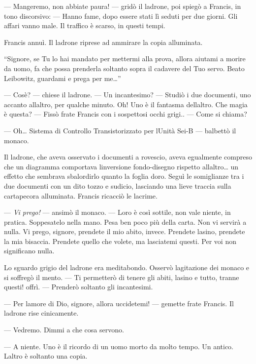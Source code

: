 --- Mangeremo, non abbiate paura! --- gridò il ladrone, poi spiegò a
Francis, in tono discorsivo: --- Hanno fame, dopo essere stati lì seduti
per due giorni. Gli affari vanno male. Il traffico è scarso, in questi
tempi.

Francis annuì. Il ladrone riprese ad ammirare la copia alluminata.

``Signore, se Tu lo hai mandato per mettermi alla prova, allora aiutami
a morire da uomo, fa\textquotesingle{} che possa prenderla soltanto
sopra il cadavere del Tuo servo. Beato Leibowitz, guardami e prega per
me\ldots''

--- Cos\textquotesingle è? --- chiese il ladrone. --- Un incantesimo?
--- Studiò i due documenti, uno accanto all\textquotesingle altro, per
qualche minuto. Oh! Uno è il fantasma dell\textquotesingle altro. Che
magia è questa? --- Fissò frate Francis con i sospettosi occhi grigi..
--- Come si chiama?

--- Oh\ldots{} Sistema di Controllo Transistorizzato per
l\textquotesingle Unità Sei-B --- balbettò il monaco.

Il ladrone, che aveva osservato i documenti a rovescio, aveva egualmente
compreso che un diagramma comportava l\textquotesingle inversione
fondo-disegno rispetto all\textquotesingle altro\ldots{} un effetto che
sembrava sbalordirlo quanto la foglia d\textquotesingle oro. Seguì le
somiglianze tra i due documenti con un dito tozzo e sudicio, lasciando
una lieve traccia sulla cartapecora alluminata. Francis ricacciò le
lacrime.

--- \emph{Vi prego!} --- ansimò il monaco. --- L\textquotesingle oro è
così sottile, non vale niente, in pratica. Soppesatelo nella mano. Pesa
ben poco più della carta. Non vi servirà a nulla. Vi prego, signore,
prendete il mio abito, invece. Prendete l\textquotesingle asino,
prendete la mia bisaccia. Prendete quello che volete, ma lasciatemi
questi. Per voi non significano nulla.

Lo sguardo grigio del ladrone era meditabondo. Osservò
l\textquotesingle agitazione dei monaco e si soffregò il mento. --- Ti
permetterò di tenere gli abiti, l\textquotesingle asino e tutto, tranne
questi! offrì. --- Prenderò soltanto gli incantesimi.

--- Per l\textquotesingle amore di Dio, signore, allora uccidetemi! ---
gemette frate Francis. Il ladrone rise cinicamente.

--- Vedremo. Dimmi a che cosa servono.

--- A niente. Uno è il ricordo di un uomo morto da molto tempo. Un
antico. L\textquotesingle altro è soltanto una copia.

